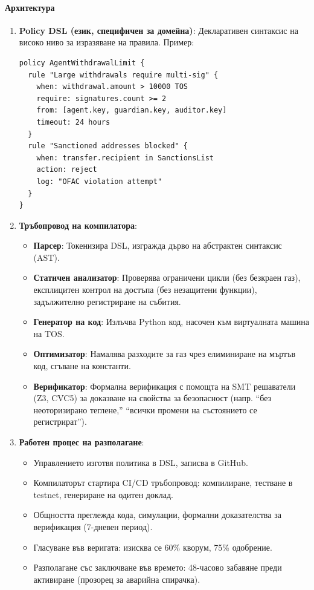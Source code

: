 \documentclass[11pt]{article}
\begin{document}
\paragraph{Архитектура}
\begin{enumerate}[noitemsep]
  \item \textbf{Policy DSL (език, специфичен за домейна)}: Декларативен синтаксис на високо ниво за изразяване на правила. Пример:
  \begin{verbatim}
policy AgentWithdrawalLimit {
  rule "Large withdrawals require multi-sig" {
    when: withdrawal.amount > 10000 TOS
    require: signatures.count >= 2
    from: [agent.key, guardian.key, auditor.key]
    timeout: 24 hours
  }
  rule "Sanctioned addresses blocked" {
    when: transfer.recipient in SanctionsList
    action: reject
    log: "OFAC violation attempt"
  }
}
  \end{verbatim}
  \item \textbf{Тръбопровод на компилатора}:
    \begin{itemize}[noitemsep]
      \item \textbf{Парсер}: Токенизира DSL, изгражда дърво на абстрактен синтаксис (AST).
      \item \textbf{Статичен анализатор}: Проверява ограничени цикли (без безкраен газ), експлицитен контрол на достъпа (без незащитени функции), задължително регистриране на събития.
      \item \textbf{Генератор на код}: Излъчва Python код, насочен към виртуалната машина на TOS.
      \item \textbf{Оптимизатор}: Намалява разходите за газ чрез елиминиране на мъртъв код, сгъване на константи.
      \item \textbf{Верификатор}: Формална верификация с помощта на SMT решаватели (Z3, CVC5) за доказване на свойства за безопасност (напр. ``без неоторизирано теглене,'' ``всички промени на състоянието се регистрират'').
    \end{itemize}
  \item \textbf{Работен процес на разполагане}:
    \begin{itemize}[noitemsep]
      \item Управлението изготвя политика в DSL, записва в GitHub.
      \item Компилаторът стартира CI/CD тръбопровод: компилиране, тестване в testnet, генериране на одитен доклад.
      \item Общността преглежда кода, симулации, формални доказателства за верификация (7-дневен период).
      \item Гласуване във веригата: изисква се 60\% кворум, 75\% одобрение.
      \item Разполагане със заключване във времето: 48-часово забавяне преди активиране (прозорец за аварийна спирачка).
    \end{itemize}
\end{enumerate}
\end{document}
